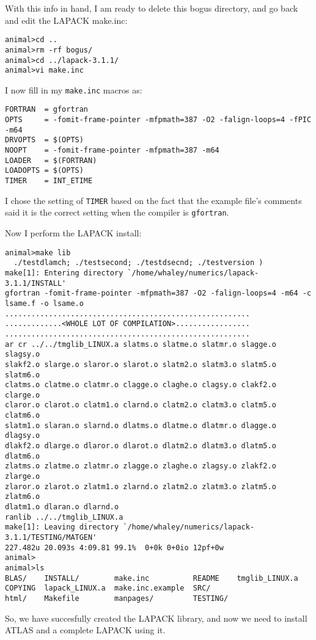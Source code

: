 \documentclass[11pt]{article}
\begin{document}
{With this info in hand, I am ready to delete this
bogus directory, and go back and edit the LAPACK make.inc:
\vspace*{-0.1in}
\begin{verbatim}
animal>cd ..
animal>rm -rf bogus/
animal>cd ../lapack-3.1.1/
animal>vi make.inc
\end{verbatim}

I now fill in my {\tt make.inc} macros as:
\vspace*{-0.1in}
\begin{verbatim}
FORTRAN  = gfortran
OPTS     = -fomit-frame-pointer -mfpmath=387 -O2 -falign-loops=4 -fPIC -m64
DRVOPTS  = $(OPTS)
NOOPT    = -fomit-frame-pointer -mfpmath=387 -m64
LOADER   = $(FORTRAN)
LOADOPTS = $(OPTS)
TIMER    = INT_ETIME
\end{verbatim}

I chose the setting of {\tt TIMER} based on the fact that the example file's
comments said it is the correct setting when the compiler is {\tt gfortran}.

Now I perform the LAPACK install:
\vspace*{-0.1in}
\begin{footnotesize}
\begin{verbatim}
animal>make lib
  ./testdlamch; ./testsecond; ./testdsecnd; ./testversion )
make[1]: Entering directory `/home/whaley/numerics/lapack-3.1.1/INSTALL'
gfortran -fomit-frame-pointer -mfpmath=387 -O2 -falign-loops=4 -m64 -c lsame.f -o lsame.o
........................................................
.............<WHOLE LOT OF COMPILATION>.................
........................................................
ar cr ../../tmglib_LINUX.a slatms.o slatme.o slatmr.o slagge.o slagsy.o
slakf2.o slarge.o slaror.o slarot.o slatm2.o slatm3.o slatm5.o slatm6.o
clatms.o clatme.o clatmr.o clagge.o claghe.o clagsy.o clakf2.o clarge.o
claror.o clarot.o clatm1.o clarnd.o clatm2.o clatm3.o clatm5.o clatm6.o
slatm1.o slaran.o slarnd.o dlatms.o dlatme.o dlatmr.o dlagge.o dlagsy.o
dlakf2.o dlarge.o dlaror.o dlarot.o dlatm2.o dlatm3.o dlatm5.o dlatm6.o
zlatms.o zlatme.o zlatmr.o zlagge.o zlaghe.o zlagsy.o zlakf2.o zlarge.o
zlaror.o zlarot.o zlatm1.o zlarnd.o zlatm2.o zlatm3.o zlatm5.o zlatm6.o
dlatm1.o dlaran.o dlarnd.o
ranlib ../../tmglib_LINUX.a
make[1]: Leaving directory `/home/whaley/numerics/lapack-3.1.1/TESTING/MATGEN'
227.482u 20.093s 4:09.81 99.1%  0+0k 0+0io 12pf+0w
animal>
animal>ls
BLAS/    INSTALL/        make.inc          README    tmglib_LINUX.a
COPYING  lapack_LINUX.a  make.inc.example  SRC/
html/    Makefile        manpages/         TESTING/
\end{verbatim}
\end{footnotesize}

So, we have succesfully created the LAPACK library, and now we need to
install ATLAS and a complete LAPACK using it.
}
\end{document}
